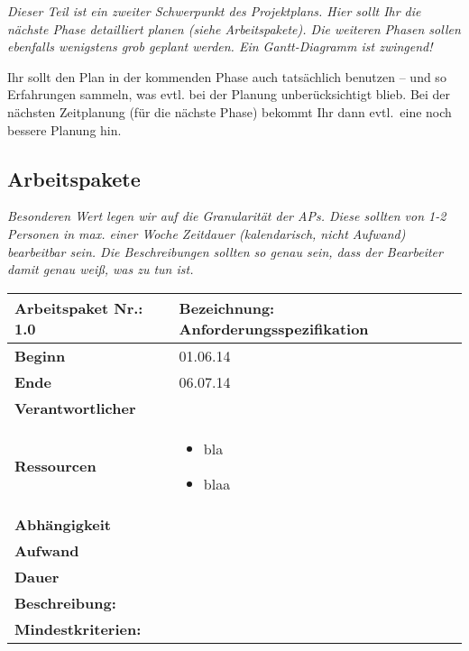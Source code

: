 \documentclass[fontsize=12pt,paper=a4,twoside]{scrartcl}
\begin{document}
{\em Dieser Teil ist ein zweiter Schwerpunkt des Projektplans. Hier sollt Ihr die nächste Phase detailliert planen (siehe Arbeitspakete). Die weiteren Phasen sollen ebenfalls wenigstens grob geplant werden. Ein Gantt-Diagramm ist zwingend! 

Ihr sollt den Plan in der kommenden Phase auch tatsächlich benutzen -- und so
  Erfahrungen sammeln, was evtl. bei der Planung unberücksichtigt
  blieb. Bei der nächsten Zeitplanung (für die nächste Phase) bekommt
  Ihr dann evtl.\ eine noch bessere Planung hin.}

\subsection{Arbeitspakete}\label{aps}


{\em Besonderen Wert legen wir auf die Granularität der APs. Diese
  sollten von 1-2 Personen in max. einer Woche Zeitdauer (kalendarisch, nicht
  Aufwand) bearbeitbar sein. Die Beschreibungen sollten so genau sein,
  dass der Bearbeiter damit genau weiß, was zu tun ist.}
  

\begin{tabular}{|p{5.3cm}|p{9.7cm}|}\hline
	\textbf{Arbeitspaket Nr.:} 1.0 & \textbf{Bezeichnung:} Anforderungsspezifikation\\ \hline \hline
	\textbf{Beginn} & 01.06.14\\ \hline
	\textbf{Ende} & 06.07.14\\ \hline
	\textbf{Verantwortlicher} & \\ \hline
	\textbf{Ressourcen} & \begin{itemize}
		\item bla
		\item blaa
	\end{itemize}    \\ \hline
	\textbf{Abhängigkeit} &\\ \hline
	\textbf{Aufwand} & \\ \hline
	\textbf{Dauer} & \\ \hline
	\multicolumn{2}{|p{15cm}|}{\textbf{Beschreibung:}\newline   }\\ \hline
	\multicolumn{2}{|p{15cm}|}{\textbf{Mindestkriterien:}\newline }\\ \hline
\end{tabular}

\begin{verbatim} 
\end{verbatim}
\end{document}
